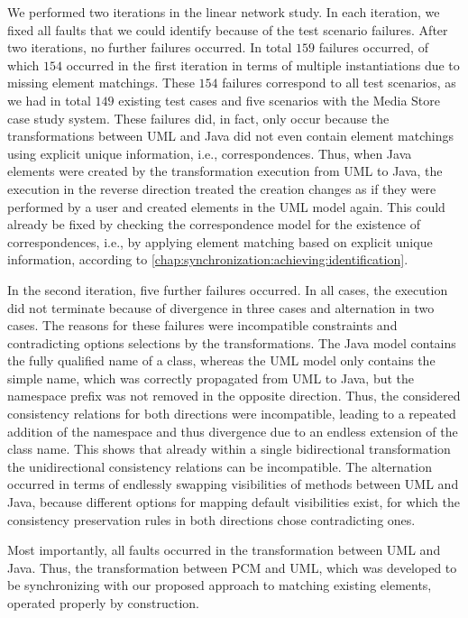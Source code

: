 We performed two iterations in the linear network study.
In each iteration, we fixed all faults that we could identify because of the test scenario failures.
After two iterations, no further failures occurred.
In total $159$ failures occurred, of which $154$ occurred in the first iteration in terms of multiple instantiations due to missing element matchings.
These $154$ failures correspond to all test scenarios, as we had in total $149$ existing test cases and five scenarios with the Media Store case study system.
These failures did, in fact, only occur because the transformations between \gls{UML} and Java did not even contain element matchings using explicit unique information, i.e., correspondences.
Thus, when Java elements were created by the transformation execution from \gls{UML} to Java, the execution in the reverse direction treated the creation changes as if they were performed by a user and created elements in the \gls{UML} model again.
This could already be fixed by checking the correspondence model for the existence of correspondences, i.e., by applying element matching based on explicit unique information, according to \autoref{chap:synchronization:achieving:identification}.

In the second iteration, five further failures occurred.
In all cases, the execution did not terminate because of divergence in three cases and alternation in two cases.
The reasons for these failures were incompatible constraints and contradicting options selections by the transformations.
The Java model contains the fully qualified name of a class, whereas the \gls{UML} model only contains the simple name, which was correctly propagated from \gls{UML} to Java, but the namespace prefix was not removed in the opposite direction.
Thus, the considered consistency relations for both directions were incompatible, leading to a repeated addition of the namespace and thus divergence due to an endless extension of the class name.
This shows that already within a single bidirectional transformation the unidirectional consistency relations can be incompatible.
The alternation occurred in terms of endlessly swapping visibilities of methods between \gls{UML} and Java, because different options for mapping default visibilities exist, for which the consistency preservation rules in both directions chose contradicting ones. %

Most importantly, all faults occurred in the transformation between \gls{UML} and Java.
Thus, the transformation between \gls{PCM} and \gls{UML}, which was developed to be synchronizing with our proposed approach to matching existing elements, operated properly by construction.

